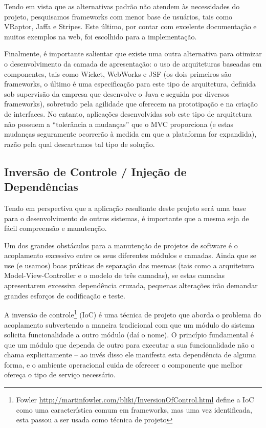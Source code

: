 \documentclass[11pt]{book}
\begin{document}
Tendo em vista que as alternativas padrão não atendem às necessidades do projeto, pesquisamos frameworks com menor base de usuários, tais como VRaptor, Jaffa e Stripes. Este último, por contar com excelente documentação e muitos exemplos na web, foi escolhido para a implementação.

Finalmente, é importante salientar que existe uma outra alternativa para otimizar o desenvolvimento da camada de apresentação: o uso de arquiteturas baseadas em componentes, tais como Wicket, WebWorks e JSF (os dois primeiros são frameworks, o último é uma especificação para este tipo de arquitetura, definida sob supervisão da empresa que desenvolve o Java e seguida por diversos frameworks), sobretudo pela agilidade que oferecem na prototipação e na criação de interfaces. No entanto, aplicações desenvolvidas sob este tipo de arquitetura não possuem a “tolerância a mudanças” que o MVC proporciona (e estas mudanças seguramente ocorrerão à medida em que a plataforma for expandida), razão pela qual descartamos tal tipo de solução.

\subsection{Inversão de Controle / Injeção de Dependências}

Tendo em perspectiva que a aplicação resultante deste projeto será uma base para o desenvolvimento de outros sistemas, é importante que a mesma seja de fácil compreensão e manutenção.

Um dos grandes obstáculos para a manutenção de projetos de software é o acoplamento excessivo entre os seus diferentes módulos e camadas. Ainda que se use (e usamos) boas práticas de separação das mesmas (tais como a arquitetura Model-View-Controller e o modelo de três camadas), se estas camadas apresentarem excessiva dependência cruzada, pequenas alterações irão demandar grandes esforços de codificação e teste.

A inversão de controle\footnote{Fowler \url{http://martinfowler.com/bliki/InversionOfControl.html} define a IoC como uma característica comum em frameworks, mas uma vez identificada, esta passou a ser usada como técnica de projeto } (IoC) é uma técnica de projeto que aborda o problema do acoplamento subvertendo a maneira tradicional com que um módulo do sistema solicita funcionalidade a outro módulo (daí o nome). O princípio fundamental é que um módulo que dependa de outro para executar a sua funcionalidade não o chama explicitamente – ao invés disso ele manifesta esta dependência de alguma forma, e o ambiente operacional cuida de oferecer o componente que melhor ofereça o tipo de serviço necessário.
\end{document}
